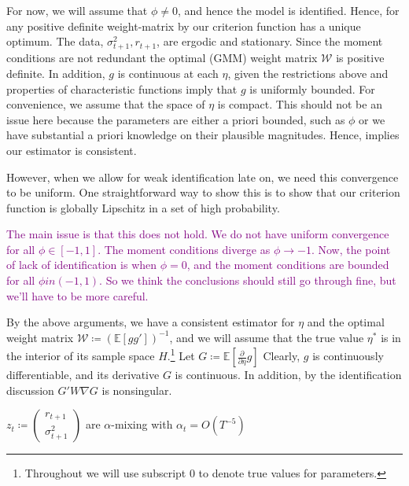 \documentclass[11pt]{article}
\newcommand{\purple}[1]{\textcolor{purple}{#1}}
\newcommand*{\W}{\mathcal{W}}
\newcommand*{\E}{\mathbb{E}}
\newcommand*{\Eta}{H}
\newcommand*{\popmom}{\ensuremath{g}}
\begin{document}
For now, we will assume that $\phi \neq 0$, and hence the model is identified.
Hence, for any positive definite weight-matrix by \textcite[Lemma 2.3]{newey1994large} our criterion function has
a unique optimum.
The data, $\sigma^2_{t+1}, r_{t+1}$, are ergodic and stationary.
Since the moment conditions are not redundant the optimal (GMM) weight matrix $\W$ is positive definite. 
In addition, $\popmom$ is continuous at each $\eta$, given the restrictions above and properties of characteristic
functions imply that $\popmom$ is uniformly bounded. 
For convenience, we assume that the space of $\eta$ is compact.
This should not be an issue here because the parameters  are either a priori bounded, such as $\phi$ or we have
substantial a priori knowledge on their plausible magnitudes.
Hence, \textcite[Theroem 2.6]{newey1994large} implies our estimator is consistent.

However, when we allow for weak identification late on, we need this convergence to be uniform. 
One straightforward way to show this is to show that our criterion function is globally Lipschitz in a set of high
probability. 

\purple{The main issue is that this does not hold. We do not have uniform convergence for all $\phi \in [-1,1]$.
The moment conditions diverge as $\phi \to -1$. Now, the point of lack of identification is when $\phi = 0$, and
the moment conditions are bounded for all $\phi in (-1,1)$. So we think the conclusions should still go through
fine, but we'll have to be more careful.}


By the above arguments, we have a consistent estimator for $\eta$ and the optimal weight matrix $\W \coloneqq
(\E\left[g g'\right])^{-1}$, and we will assume that the true value $\eta^{*}$ is in the interior of its sample
space $\Eta$.\footnote{Throughout we will use subscript \num{0}  to denote true values for parameters.}
Let $G \coloneqq \E\left[\frac{\partial}{\partial \eta} \popmom \right]$
Clearly, $g$ is continuously differentiable, and its derivative $G$ is continuous.
In addition, by the identification discussion $G' W \nabla G$ is nonsingular.


\begin{assump}
    \label{assumption:weak_dependence}
    $z_t \coloneqq \begin{pmatrix} r_{t+1} \\ \sigma^2_{t+1} \end{pmatrix}$ are $\alpha$-mixing with $\alpha_t =
       O\left(T^{-5}\right)$
\end{assump}
\end{document}
